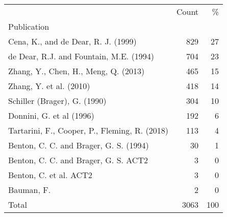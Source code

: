 \begin{tabular}{lrr}
\toprule
 & Count & \% \\
Publication &  &  \\
\midrule
Cena, K., and de Dear, R. J. (1999) & 829 & 27 \\
de Dear, R.J. and Fountain, M.E. (1994) & 704 & 23 \\
Zhang, Y., Chen, H., Meng, Q. (2013) & 465 & 15 \\
Zhang, Y. et al. (2010) & 418 & 14 \\
Schiller (Brager), G. (1990) & 304 & 10 \\
Donnini, G. et al (1996) & 192 & 6 \\
Tartarini, F., Cooper, P., Fleming, R. (2018) & 113 & 4 \\
Benton, C. C. and Brager, G. S. (1994) & 30 & 1 \\
Benton, C. C. and Brager, G. S. ACT2 & 3 & 0 \\
Benton, C. et al. ACT2 & 3 & 0 \\
Bauman, F. & 2 & 0 \\
Total & 3063 & 100 \\
\bottomrule
\end{tabular}

